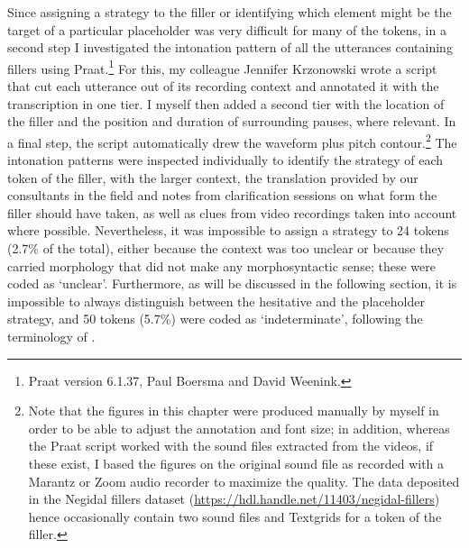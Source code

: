 \documentclass[output=paper]{langscibook}
\begin{document}
Since assigning a strategy to the filler or identifying which element might be the target of a particular placeholder was very difficult for many of the tokens, in a second step I investigated the intonation pattern of all the utterances containing fillers using Praat.\footnote{Praat version 6.1.37, Paul Boersma and David Weenink.} For this, my colleague Jennifer Krzonowski wrote a script that cut each utterance out of its recording context and annotated it with the transcription in one tier. I myself then added a second tier with the location of the filler and the position and duration of surrounding pauses, where relevant. In a final step, the script automatically drew the waveform plus pitch contour.\footnote{Note that the figures in this chapter were produced manually by myself in order to be able to adjust the annotation and font size; in addition, whereas the Praat script worked with the sound files extracted from the videos, if these exist, I based the figures on the original sound file as recorded with a Marantz or Zoom audio recorder to maximize the quality. The data deposited in the Negidal fillers dataset (\url{https://hdl.handle.net/11403/negidal-fillers}) hence occasionally contain two sound files and Textgrids for a token of the filler.} The intonation patterns were inspected individually to identify the strategy of each token of the filler, with the larger context, the translation provided by our consultants in the field and notes from clarification sessions on what form the filler should have taken, as well as clues from video recordings taken into account where possible. Nevertheless, it was impossible to assign a strategy to 24 tokens (2.7\% of the total), either because the context was too unclear or because they carried morphology that did not make any morphosyntactic sense; these were coded as ‘unclear’. Furthermore, as will be discussed in the following section, it is impossible to always distinguish between the hesitative and the placeholder strategy, and 50 tokens (5.7\%) were coded as ‘indeterminate’, following the terminology of \cite{chapters/billings_mcdonnell}.
\end{document}
